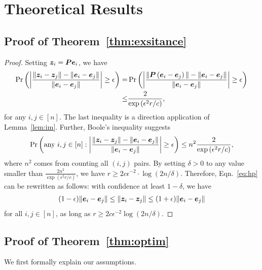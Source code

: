 \allowdisplaybreaks
\section{Theoretical Results}\label{apx:proof}


\subsection{Proof of Theorem~\ref{thm:exsitance}}\label{apx:proof:expr}
\expr*
\begin{proof}

Setting ${\bm{z}}_i = {\bm{P}} {\bm{e}}_i$, we have
\begin{align}
        \Pr\left( \left| \frac{ \| {\bm{z}}_i - {\bm{z}}_j \| - \|{\bm{e}}_i - {\bm{e}}_j\|}{\|{\bm{e}}_i - {\bm{e}}_j\|} \right| \ge \epsilon \right)
        =& \Pr\left( \left| \frac{ \| {\bm{P}} \left( {\bm{e}}_i - {\bm{e}}_j \right) \| - \|{\bm{e}}_i - {\bm{e}}_j\|}{\|{\bm{e}}_i - {\bm{e}}_j\|}  \right| \ge \epsilon \right) \\
        \le& \frac{2}{ \exp\left(\epsilon^2r/c\right)},
    \end{align}
    for any $i,j \in [n]$. The last inequality is a direction application of Lemma~\ref{lem:im}. Further, Boole's inequality suggests
    \begin{align}
        \Pr\left(\text{any } i,j \in [n] : \left| \frac{ \| {\bm{z}}_i - {\bm{z}}_j \| - \|{\bm{e}}_i - {\bm{e}}_j\|}{\|{\bm{e}}_i - {\bm{e}}_j\|} \right| \ge \epsilon \right) \le n^2 \frac{2}{ \exp\left(\epsilon^2r/c\right)},\label{eq:hp}
    \end{align}
    where $n^2$ comes from counting all $(i,j)$ pairs. By setting $\delta > 0$ to any value smaller than $\frac{2n^2}{ \exp\left(\epsilon^2r/c\right)}$, we have $r \ge 2c\epsilon^{-2} \cdot \log(2n/\delta)$. Therefore, Eqn.~\eqref{eq:hp} can be rewritten as follows: with confidence at least $1-\delta$, we have \begin{align}
        (1-\epsilon) \| {\bm{e}}_i - {\bm{e}}_j \| \le \| {\bm{z}}_i - {\bm{z}}_j \| \le (1+\epsilon) \| {\bm{e}}_i - {\bm{e}}_j \|
    \end{align}
    for all $i,j \in [n]$, as long as $r\ge 2c\epsilon^{-2}  \log(2n/\delta)$.
\end{proof}

\subsection{Proof of 
Theorem~\ref{thm:optim}}\label{apx:proof:optim}

We first formally explain our assumptions.

